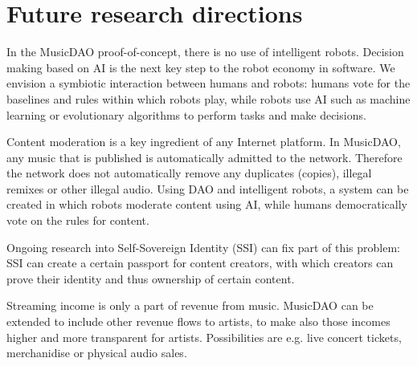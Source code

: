 \section{Future research directions}
In the MusicDAO proof-of-concept, there is no use of intelligent robots. Decision making based on AI is the next key step to the robot economy in software. We envision a symbiotic interaction between humans and robots: humans vote for the baselines and rules within which robots play, while robots use AI such as machine learning or evolutionary algorithms to perform tasks and make decisions. 

Content moderation is a key ingredient of any Internet platform. In MusicDAO, any music that is published is automatically admitted to the network. Therefore the network does not automatically remove any duplicates (copies), illegal remixes or other illegal audio. Using DAO and intelligent robots, a system can be created in which robots moderate content using AI, while humans democratically vote on the rules for content.

Ongoing research into Self-Sovereign Identity (SSI) can fix part of this problem: SSI can create a certain passport for content creators, with which creators can prove their identity and thus ownership of certain content.


Streaming income is only a part of revenue from music. MusicDAO can be extended to include other revenue flows to artists, to make also those incomes higher and more transparent for artists. Possibilities are e.g. live concert tickets, merchanidise or physical audio sales.

